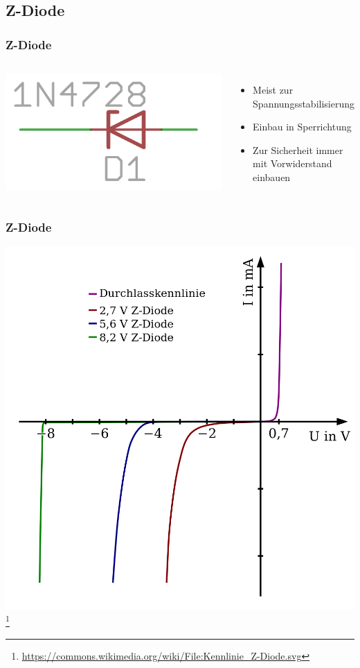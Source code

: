 \subsection*{Z-Diode}
\begin{frame}
    \frametitle{Z-Diode}
	\begin{columns}[c]
        \begin{center}
        \includegraphics[width=.8\textwidth,height=.3\textheight,keepaspectratio]{a05/z-diode.png}
        \end{center}
    \begin{itemize}
			\item Meist zur Spannungsstabilisierung
			\item Einbau in Sperrichtung
			\item Zur Sicherheit immer mit Vorwiderstand einbauen
    \end{itemize}
    \end{columns}
\end{frame}

\begin{frame}
    \frametitle{Z-Diode}
    \begin{center}
        \includegraphics[width=.7\textwidth,height=.75\textheight,keepaspectratio]{a05/Kennlinie_Z-Diode.png}
        \footnote{\tiny \url{https://commons.wikimedia.org/wiki/File:Kennlinie_Z-Diode.svg}}
	\end{center}
\end{frame}

